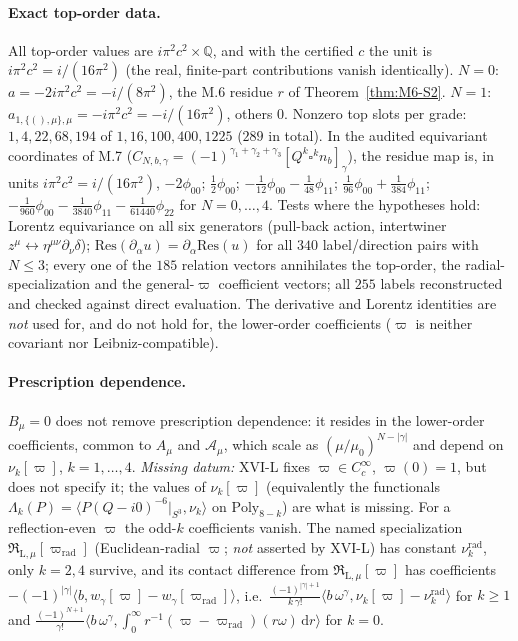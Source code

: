 \documentclass{article}
\theoremstyle{remark}
\begin{document}
\paragraph{Exact top-order data.}
All top-order values are $i\pi^2c^2\times\mathbb Q$, and with the certified $c$ the unit is $i\pi^2c^2=i/(16\pi^2)$ (the real, finite-part contributions vanish identically).
$N=0$: $a=-2i\pi^2c^2=-i/(8\pi^2)$, the M.6 residue $r$ of Theorem~\ref{thm:M6-S2}. $N=1$: $a_{1,\{(),\mu\},\mu}=-i\pi^2c^2=-i/(16\pi^2)$, others $0$.
Nonzero top slots per grade: $1,4,22,68,194$ of $1,16,100,400,1225$ ($289$ in total).
In the audited equivariant coordinates of M.7 ($C_{N,b,\gamma}=(-1)^{\gamma_1+\gamma_2+\gamma_3}[Q^k\square^k n_b]_\gamma$), the residue map is, in units $i\pi^2c^2=i/(16\pi^2)$,
$-2\phi_{00}$; $\tfrac12\phi_{00}$; $-\tfrac1{12}\phi_{00}-\tfrac1{48}\phi_{11}$; $\tfrac1{96}\phi_{00}+\tfrac1{384}\phi_{11}$; $-\tfrac1{960}\phi_{00}-\tfrac1{3840}\phi_{11}-\tfrac1{61440}\phi_{22}$ for $N=0,\dots,4$.
Tests where the hypotheses hold: Lorentz equivariance on all six generators (pull-back action, intertwiner $z^\mu\leftrightarrow\eta^{\mu\nu}\partial_\nu\delta$); $\mathrm{Res}(\partial_\alpha u)=\partial_\alpha\mathrm{Res}(u)$ for all $340$ label/direction pairs with $N\le3$; every one of the $185$ relation vectors annihilates the top-order, the radial-specialization and the general-$\varpi$ coefficient vectors; all $255$ labels reconstructed and checked against direct evaluation.
The derivative and Lorentz identities are \emph{not} used for, and do not hold for, the lower-order coefficients ($\varpi$ is neither covariant nor Leibniz-compatible).

\paragraph{Prescription dependence.}
$B_\mu=0$ does not remove prescription dependence: it resides in the lower-order coefficients, common to $A_\mu$ and $\mathcal A_\mu$, which scale as $(\mu/\mu_0)^{N-|\gamma|}$ and depend on $\nu_k[\varpi]$, $k=1,\dots,4$.
\emph{Missing datum:} XVI-L fixes $\varpi\in C_c^\infty$, $\varpi(0)=1$, but does not specify it; the values of $\nu_k[\varpi]$ (equivalently the functionals $\Lambda_k(P)=\langle P(Q-i0)^{-6}|_{S^3},\nu_k\rangle$ on $\mathrm{Poly}_{8-k}$) are what is missing.
For a reflection-even $\varpi$ the odd-$k$ coefficients vanish.
The named specialization $\mathfrak R_{\mathrm L,\mu}[\varpi_{\mathrm{rad}}]$ (Euclidean-radial $\varpi$; \emph{not} asserted by XVI-L) has constant $\nu_k^{\mathrm{rad}}$, only $k=2,4$ survive, and its contact difference from $\mathfrak R_{\mathrm L,\mu}[\varpi]$ has coefficients $-(-1)^{|\gamma|}\langle b,w_\gamma[\varpi]-w_\gamma[\varpi_{\mathrm{rad}}]\rangle$, i.e.\ $\frac{(-1)^{|\gamma|+1}}{k\,\gamma!}\langle b\,\omega^\gamma,\nu_k[\varpi]-\nu_k^{\mathrm{rad}}\rangle$ for $k\ge1$ and $\frac{(-1)^{N+1}}{\gamma!}\langle b\,\omega^\gamma,\int_0^\infty r^{-1}(\varpi-\varpi_{\mathrm{rad}})(r\omega)\,\mathrm dr\rangle$ for $k=0$.
\end{document}
